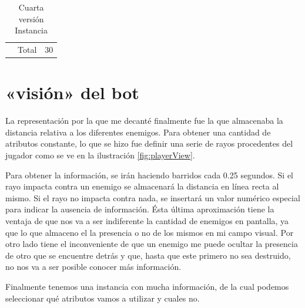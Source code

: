 \begin{table}[]
\begin{tabular}{c|c|c|}
                                                                                             & Total                                                                                                 & 30    \\ \cline{2-3} 
\end{tabular}
\caption{Cuarta versión Instancia}
\label{my-label}
\end{table}


\section{«visión» del bot}

La representación por la que me decanté finalmente fue la que almacenaba la distancia relativa a los diferentes enemigos. Para obtener una cantidad de atributos constante, lo que se hizo fue definir una serie de rayos procedentes del jugador como se ve en la ilustración \ref{fig:playerView}.



Para obtener la información, se irán haciendo barridos cada 0.25 segundos. Si el rayo impacta contra un enemigo se almacenará la distancia en línea recta al mismo. Si el rayo no impacta contra nada, se insertará un valor numérico especial para indicar la ausencia de información. Ésta última aproximación tiene la ventaja de que nos va a ser indiferente la cantidad de enemigos en pantalla, ya que lo que almaceno el la presencia o no de los mismos en mi campo visual. Por otro lado tiene el inconveniente de que un enemigo me puede ocultar la presencia de otro que se encuentre detrás y que, hasta que este primero no sea destruido, no nos va a ser posible conocer más información.

Finalmente tenemos una instancia con mucha información, de la cual podemos seleccionar qué atributos vamos a utilizar y cuales no.

